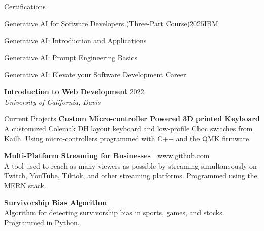 \documentclass{resume}
\begin{document}
    \begin{rSection}{Certifications}
        \begin{rSubsection}{Generative AI for Software Developers (Three-Part Course)}{2025}{IBM}{}
            \item Generative AI: Introduction and Applications
            \item Generative AI: Prompt Engineering Basics
            \item Generative AI: Elevate your Software Development Career
        \end{rSubsection}
        
        \textbf{Introduction to Web Development}
        \hfill {2022} \\ 
        {\em University of California, Davis}
        \hfill{}
    \end{rSection}

    \begin{rSection}{Current Projects}
        \textbf{Custom Micro-controller Powered 3D printed Keyboard}
        \\ A customized Colemak DH layout keyboard and low-profile Choc switches from Kailh. Using micro-controllers programmed with C++ and the QMK firmware.
        
        \textbf{Multi-Platform Streaming for Businesses}  |  \href{Github Repository} \url{www.github.com}
        \\ A tool used to reach as many viewers as possible by streaming simultaneously on Twitch, YouTube, Tiktok, and other streaming platforms.
        Programmed using the MERN stack.

        \textbf{Survivorship Bias Algorithm}
        \\ Algorithm for detecting survivorship bias in sports, games, and stocks. 
        Programmed in Python.
    \end{rSection}
    
\end{document}
